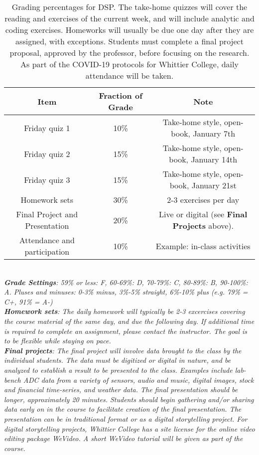 \documentclass[10pt]{article}
\begin{document}
\begin{table}
\centering
\begin{tabular}{| c | c | c |}
\hline
Item & Fraction of Grade & Note \\ \hline
Friday quiz 1 & 10\% & Take-home style, open-book, January 7th \\ \hline
Friday quiz 2 & 15\% & Take-home style, open-book, January 14th \\ \hline
Friday quiz 3 & 15\% & Take-home style, open-book, January 21st \\ \hline
Homework sets & 30\% & 2-3 exercises per day \\ \hline
Final Project and Presentation & 20\% & Live or digital (see \textbf{Final Projects} above). \\ \hline
Attendance and participation & 10\% & Example: in-class activities \\ \hline
\end{tabular}
\caption{\label{tab:grading} Grading percentages for DSP.  The take-home quizzes will cover the reading and exercises of the current week, and will include analytic and coding exercises.  Homeworks will usually be due one day after they are assigned, with exceptions.  Students must complete a final project proposal, approved by the professor, before focusing on the research.  As part of the COVID-19 protocols for Whittier College, daily attendance will be taken.}
\end{table} \\
\textit{\textbf{Grade Settings}: 59\% or less: F, 60-69\%: D, 70-79\%: C, 80-89\%: B, 90-100\%: A.  Pluses and minuses: 0-3\% minus, 3\%-5\% straight, 6\%-10\% plus (e.g. 79\% = C+, 91\% = A-)} \\
\textit{\textbf{Homework sets}: The daily homework will typically be 2-3 excercises covering the course material of the same day, and due the following day.  If additional time is required to complete an assignment, please contact the instructor.  The goal is to be flexible while staying on pace.} \\
\textit{\textbf{Final projects}: The final project will involve data brought to the class by the individual students.  The data must be digitized or digital in nature, and be analyzed to establish a result to be presented to the class.  Examples include lab-bench ADC data from a variety of sensors, audio and music, digital images, stock and financial time-series, and weather data.  The final presentation should be longer, approximately 20 minutes.  Students should begin gathering and/or sharing data early on in the course to facilitate creation of the final presentation.  The presentation can be in traditional format or as a digital storytelling project.  For digital storytelling projects, Whittier College has a site license for the online video editing package WeVideo.  A short WeVideo tutorial will be given as part of the course.} \\
\end{document}
